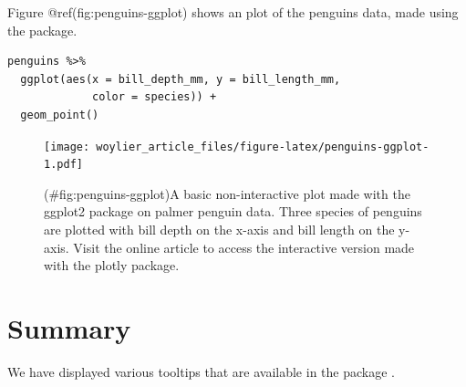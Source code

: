Figure @ref(fig:penguins-ggplot) shows an plot of the penguins data, made using the  package.

\begin{verbatim}
penguins %>% 
  ggplot(aes(x = bill_depth_mm, y = bill_length_mm, 
             color = species)) + 
  geom_point()
\end{verbatim}

\begin{figure}
\centering
\texttt{[image: woylier\_article\_files/figure-latex/penguins-ggplot-1.pdf]}
\caption{(\#fig:penguins-ggplot)A basic non-interactive plot made with the ggplot2 package on palmer penguin data. Three species of penguins are plotted with bill depth on the x-axis and bill length on the y-axis. Visit the online article to access the interactive version made with the plotly package.}
\end{figure}

\hypertarget{summary}{%
\section{Summary}\label{summary}}

We have displayed various tooltips that are available in the package .

